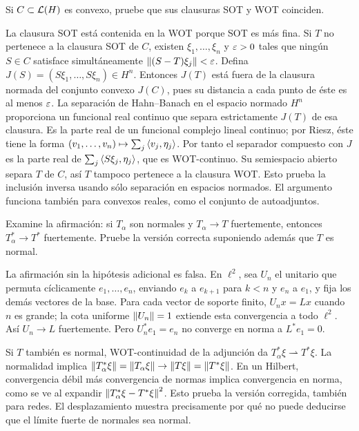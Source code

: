 \begin{ejercicio}\label{ej:v3-l31-5}
Si $C\subset\mathcal L(H)$ es convexo, pruebe que sus clausuras SOT y WOT coinciden.
\end{ejercicio}
\begin{solucion}
La clausura SOT está contenida en la WOT porque SOT es más fina. Si $T$ no pertenece a la clausura SOT de $C$, existen $\xi_1,\ldots,\xi_n$ y $\varepsilon>0$ tales que ningún $S\in C$ satisface simultáneamente $\left\lVert(S-T)\xi_j\right\rVert<\varepsilon$. Defina $J(S)=(S\xi_1,\ldots,S\xi_n)\in H^n$. Entonces $J(T)$ está fuera de la clausura normada del conjunto convexo $J(C)$, pues su distancia a cada punto de éste es al menos $\varepsilon$. La separación de Hahn--Banach en el espacio normado $H^n$ proporciona un funcional real continuo que separa estrictamente $J(T)$ de esa clausura. Es la parte real de un funcional complejo lineal continuo; por Riesz, éste tiene la forma $(v_1,\ldots,v_n)\mapsto\sum_j\left\langle v_j,\eta_j\right\rangle$. Por tanto el separador compuesto con $J$ es la parte real de $\sum_j\left\langle S\xi_j,\eta_j\right\rangle$, que es WOT-continuo. Su semiespacio abierto separa $T$ de $C$, así $T$ tampoco pertenece a la clausura WOT. Esto prueba la inclusión inversa usando sólo separación en espacios normados. El argumento funciona también para convexos reales, como el conjunto de autoadjuntos.
\end{solucion}

\begin{ejercicio}\label{ej:v3-l31-6}
Examine la afirmación: si $T_\alpha$ son normales y $T_\alpha\to T$ fuertemente, entonces $T_\alpha^*\to T^*$ fuertemente. Pruebe la versión correcta suponiendo además que $T$ es normal.
\end{ejercicio}
\begin{solucion}
La afirmación sin la hipótesis adicional es falsa. En $\ell^2$, sea $U_n$ el unitario que permuta cíclicamente $e_1,\ldots,e_n$, enviando $e_k$ a $e_{k+1}$ para $k<n$ y $e_n$ a $e_1$, y fija los demás vectores de la base. Para cada vector de soporte finito, $U_nx=Lx$ cuando $n$ es grande; la cota uniforme $\left\lVert U_n\right\rVert=1$ extiende esta convergencia a todo $\ell^2$. Así $U_n\to L$ fuertemente. Pero $U_n^*e_1=e_n$ no converge en norma a $L^*e_1=0$.

Si $T$ también es normal, WOT-continuidad de la adjunción da $T_\alpha^*\xi\rightharpoonup T^*\xi$. La normalidad implica $\left\lVert T_\alpha^*\xi\right\rVert=\left\lVert T_\alpha\xi\right\rVert\to\left\lVert T\xi\right\rVert=\left\lVert T^*\xi\right\rVert$. En un Hilbert, convergencia débil más convergencia de normas implica convergencia en norma, como se ve al expandir
$\left\lVert T_\alpha^*\xi-T^*\xi\right\rVert^2$. Esto prueba la versión corregida, también para redes. El desplazamiento muestra precisamente por qué no puede deducirse que el límite fuerte de normales sea normal.
\end{solucion}

